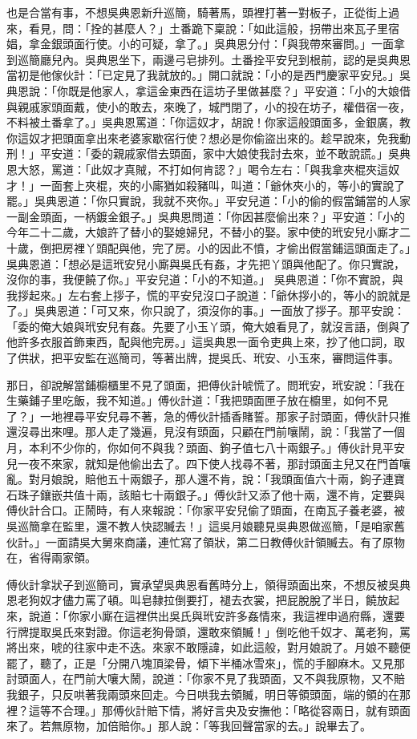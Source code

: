 也是合當有事，不想吳典恩新升巡簡，騎著馬，頭裡打著一對板子，正從街上過來，看見，問：「拴的甚麼人？」土番跪下稟說：「如此這般，拐帶出來瓦子里宿娼，拿金銀頭面行使。小的可疑，拿了。」吳典恩分付：「與我帶來審問。」一面拿到巡簡廳兒內。吳典恩坐下，兩邊弓皂排列。土番拴平安兒到根前，認的是吳典恩當初是他傢伙計：「已定見了我就放的。」開口就說：「小的是西門慶家平安兒。」吳典恩說：「你既是他家人，拿這金東西在這坊子里做甚麼？」平安道：「小的大娘借與親戚家頭面戴，使小的敢去，來晚了，城門閉了，小的投在坊子，權借宿一夜，不料被土番拿了。」吳典恩罵道：「你這奴才，胡說！你家這般頭面多，金銀廣，教你這奴才把頭面拿出來老婆家歇宿行使？想必是你偷盜出來的。趁早說來，免我動刑！」平安道：「委的親戚家借去頭面，家中大娘使我討去來，並不敢說謊。」吳典恩大怒，罵道：「此奴才真賊，不打如何肯認？」喝令左右：「與我拿夾棍夾這奴才！」一面套上夾棍，夾的小廝猶如殺豬叫，叫道：「爺休夾小的，等小的實說了罷。」吳典恩道：「你只實說，我就不夾你。」平安兒道：「小的偷的假當鋪當的人家一副金頭面，一柄鍍金銀子。」吳典恩問道：「你因甚麼偷出來？」平安道：「小的今年二十二歲，大娘許了替小的娶媳婦兒，不替小的娶。家中使的玳安兒小廝才二十歲，倒把房裡丫頭配與他，完了房。小的因此不憤，才偷出假當鋪這頭面走了。」吳典恩道：「想必是這玳安兒小廝與吳氏有姦，才先把丫頭與他配了。你只實說，沒你的事，我便饒了你。」平安兒道：「小的不知道。」 吳典恩道：「你不實說，與我拶起來。」左右套上拶子，慌的平安兒沒口子說道：「爺休拶小的，等小的說就是了。」吳典恩道：「可又來，你只說了，須沒你的事。」一面放了拶子。那平安說：「委的俺大娘與玳安兒有姦。先要了小玉丫頭，俺大娘看見了，就沒言語，倒與了他許多衣服首飾東西，配與他完房。」這吳典恩一面令吏典上來，抄了他口詞，取了供狀，把平安監在巡簡司，等著出牌，提吳氏、玳安、小玉來，審問這件事。

那日，卻說解當鋪櫥櫃里不見了頭面，把傅伙計唬慌了。問玳安，玳安說：「我在生藥鋪子里吃飯，我不知道。」傅伙計道：「我把頭面匣子放在櫥里，如何不見了？」一地裡尋平安兒尋不著，急的傅伙計插香賭誓。那家子討頭面，傅伙計只推還沒尋出來哩。那人走了幾遍，見沒有頭面，只顧在門前嚷鬧，說：「我當了一個月，本利不少你的，你如何不與我？頭面、鉤子值七八十兩銀子。」傅伙計見平安兒一夜不來家，就知是他偷出去了。四下使人找尋不著，那討頭面主兒又在門首嚷亂。對月娘說，賠他五十兩銀子，那人還不肯，說：「我頭面值六十兩，鉤子連寶石珠子鑲嵌共值十兩，該賠七十兩銀子。」傅伙計又添了他十兩，還不肯，定要與傅伙計合口。正鬧時，有人來報說：「你家平安兒偷了頭面，在南瓦子養老婆，被吳巡簡拿在監里，還不教人快認贓去！」這吳月娘聽見吳典恩做巡簡，「是咱家舊伙計。」一面請吳大舅來商議，連忙寫了領狀，第二日教傅伙計領贓去。有了原物在，省得兩家領。

傅伙計拿狀子到巡簡司，實承望吳典恩看舊時分上，領得頭面出來，不想反被吳典恩老狗奴才儘力罵了頓。叫皂隸拉倒要打，褪去衣裳，把屁脫脫了半日，饒放起來，說道：「你家小廝在這裡供出吳氏與玳安許多姦情來，我這裡申過府縣，還要行牌提取吳氏來對證。你這老狗骨頭，還敢來領贓！」倒吃他千奴才、萬老狗，罵將出來，唬的往家中走不迭。來家不敢隱諱，如此這般，對月娘說了。月娘不聽便罷了，聽了，正是「分開八塊頂梁骨，傾下半桶冰雪來」，慌的手腳麻木。又見那討頭面人，在門前大嚷大鬧，說道：「你家不見了我頭面，又不與我原物，又不賠我銀子，只反哄著我兩頭來回走。今日哄我去領贓，明日等領頭面，端的領的在那裡？這等不合理。」那傅伙計賠下情，將好言央及安撫他：「略從容兩日，就有頭面來了。若無原物，加倍賠你。」那人說：「等我回聲當家的去。」說畢去了。

